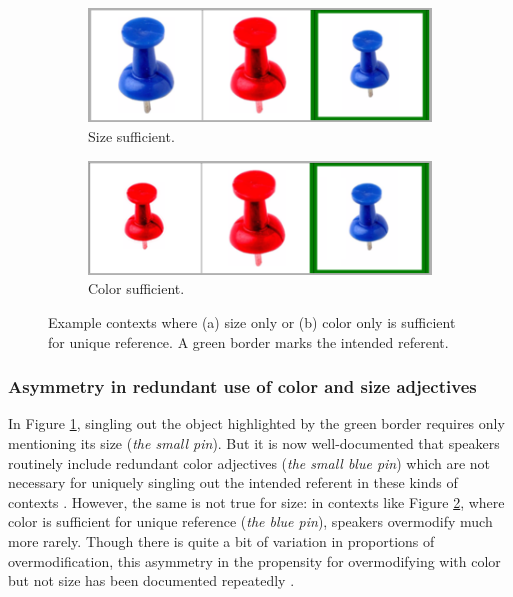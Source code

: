 \documentclass[11pt]{article}
\newcommand{\figref}[1]{Figure \ref{#1}}
\begin{document}
\begin{figure}
\begin{subfigure}{.5\textwidth}
\includegraphics[width=\textwidth]{pics/size-sufficient.png}
\caption{Size sufficient.}
\label{fig:sizesufficient}
\end{subfigure}
\begin{subfigure}{.5\textwidth}
\includegraphics[width=\textwidth]{pics/color-sufficient.png}
\caption{Color sufficient.}
\label{fig:colorsufficient}
\end{subfigure}
\caption{Example contexts where (a) size only or (b) color only is sufficient for unique reference. A green border marks the intended referent.}
\label{fig:pin}
\end{figure}



\subsubsection{Asymmetry in redundant use of color and size adjectives}
\label{sec:asymmetry}

 In \figref{fig:sizesufficient}, singling out the object highlighted by the green border requires only mentioning its size (\emph{the small pin}). But it is now well-documented that speakers routinely include redundant color adjectives (\emph{the small blue pin}) which are not necessary for uniquely singling out the intended referent in these kinds of contexts \cite{Pechmann1989, Belke2002, gatt2011}. However, the same is not true for size: in contexts like \figref{fig:colorsufficient}, where color is sufficient for unique reference (\emph{the blue pin}), speakers overmodify much more rarely. Though there is quite a bit of variation in proportions of overmodification, this asymmetry in the propensity for overmodifying with color but not size has been documented repeatedly \cite{Pechmann1989, sedivy2003a,gatt2011, rubiofernandez2016,Westerbeek2015,Koolen2013}. 
 
\end{document}
